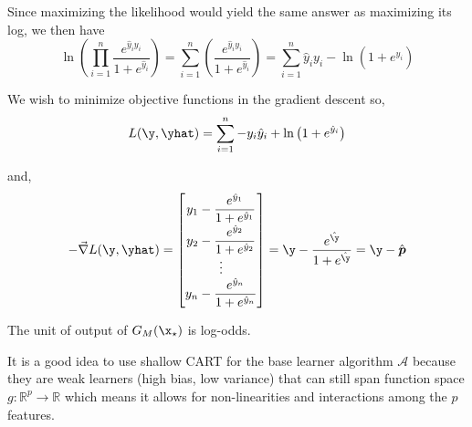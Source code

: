 \documentclass[12pt]{article}
\begin{document}
\begin{enumerate}
\begin{tcolorbox}[colback=white, sharp corners]
Since maximizing the likelihood would yield the same answer as maximizing its log, we then have 
\[
	\ln\left( \prod_{i=1}^n \dfrac{e^{\hat{y}_i y_i}}{1 + e^{\hat{y}_i}} \right) = \sum_{i=1}^n \left( \dfrac{e^{\hat{y}_i y_i}}{1 + e^{\hat{y}_i}} \right) = \sum_{i=1}^n \hat{y}_i y_i - \ln\left( 1 + e^{\hat{y}_i} \right)
\]

We wish to minimize objective functions in the gradient descent so, 
\[
	L(\y, \yhat)  = \sum_{i=1}^n -y_i \hat{y}_i + \ln\left( 1+ e^{\hat{y}_i} \right)
\]	

and, 
\[
	- \vec{\nabla}L(\y, \yhat) = \begin{bmatrix}
	y_1 - \dfrac{e^{\hat{y}_1}}{1+ e^{\hat{y}_1}} \\[6 pt]
	y_2 - \dfrac{e^{\hat{y}_2}}{1+ e^{\hat{y}_2}} \\ 
	\vdots 
	\\
	y_n - \dfrac{e^{\hat{y}_n}}{1+ e^{\hat{y}_n}} 
	\end{bmatrix} = \y - \dfrac{e^{\hat{\y}}}{1 + e^{\hat{\y}}} = \y - \hat{\boldsymbol{p}}
\]

\end{tcolorbox}


\begin{tcolorbox}[colback=white, sharp corners]
The unit of output of $G_M(\x_\star)$ is log-odds.
\end{tcolorbox}


\begin{tcolorbox}[colback=white, sharp corners]
It is a good idea to use shallow CART for the base learner algorithm $\mathcal{A}$ because they are weak learners (high bias, low variance) that can still span function space $g: \mathbb{R}^p \to \mathbb{R}$ which means it allows for non-linearities and interactions among the $p$ features.
\end{tcolorbox}



\end{enumerate}
\end{document}
